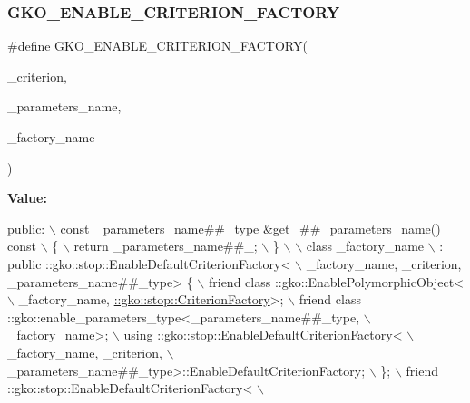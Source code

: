 \subsubsection{\texorpdfstring{G\+K\+O\+\_\+\+E\+N\+A\+B\+L\+E\+\_\+\+C\+R\+I\+T\+E\+R\+I\+O\+N\+\_\+\+F\+A\+C\+T\+O\+RY}{GKO\_ENABLE\_CRITERION\_FACTORY}}
{\footnotesize\ttfamily \#define G\+K\+O\+\_\+\+E\+N\+A\+B\+L\+E\+\_\+\+C\+R\+I\+T\+E\+R\+I\+O\+N\+\_\+\+F\+A\+C\+T\+O\+RY(\begin{DoxyParamCaption}\item[{}]{\+\_\+criterion,  }\item[{}]{\+\_\+parameters\+\_\+name,  }\item[{}]{\+\_\+factory\+\_\+name }\end{DoxyParamCaption})}

{\bfseries Value\+:}
\begin{DoxyCode}
\textcolor{keyword}{public}:                                                                      \(\backslash\)
    const \_parameters\_name##\_type &get\_##\_parameters\_name() const            \(\backslash\)
    \{                                                                        \(\backslash\)
        return \_parameters\_name##\_;                                          \(\backslash\)
    \}                                                                        \(\backslash\)
                                                                             \(\backslash\)
    class \_factory\_name                                                      \(\backslash\)
        : public ::gko::stop::EnableDefaultCriterionFactory<                 \(\backslash\)
              \_factory\_name, \_criterion, \_parameters\_name##\_type> \{          \(\backslash\)
        friend class ::gko::EnablePolymorphicObject<                         \(\backslash\)
            \_factory\_name, \hyperlink{classgko_1_1AbstractFactory}{::gko::stop::CriterionFactory}>;                   \(\backslash\)
        friend class ::gko::enable\_parameters\_type<\_parameters\_name##\_type,  \(\backslash\)
                                                   \_factory\_name>;           \(\backslash\)
        using ::gko::stop::EnableDefaultCriterionFactory<                    \(\backslash\)
            \_factory\_name, \_criterion,                                       \(\backslash\)
            \_parameters\_name##\_type>::EnableDefaultCriterionFactory;         \(\backslash\)
    \};                                                                       \(\backslash\)
    friend ::gko::stop::EnableDefaultCriterionFactory<                       \(\backslash\)

\end{DoxyCode}
